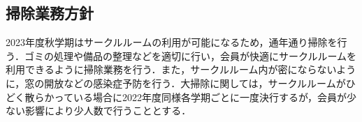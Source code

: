 \subsection*{掃除業務方針}

2023年度秋学期はサークルルームの利用が可能になるため，通年通り掃除を行う．ゴミの処理や備品の整理などを適切に行い，会員が快適にサークルルームを利用できるように掃除業務を行う．また，サークルルーム内が密にならないように，窓の開放などの感染症予防を行う．大掃除に関しては，サークルルームがひどく散らかっている場合に2022年度同様各学期ごとに一度決行するが，会員が少ない影響により少人数で行うこととする．


